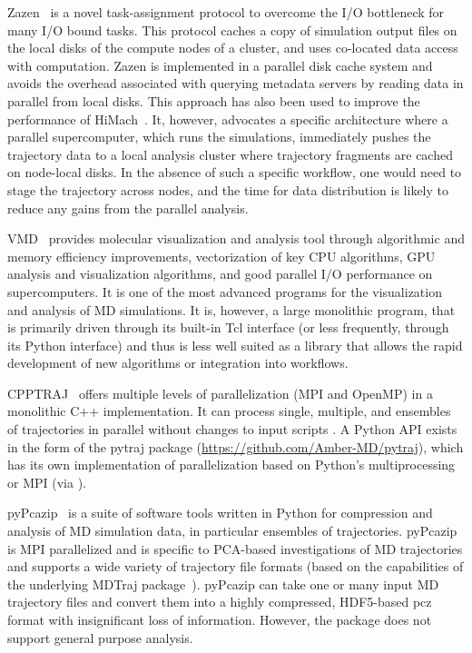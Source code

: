 Zazen~\cite{Zazen} is a novel task-assignment protocol to overcome the I/O bottleneck for many I/O bound tasks. This protocol caches a copy of simulation output files on the local disks of the compute nodes of a cluster, and uses co-located data access with computation. 
Zazen is implemented in a parallel disk cache system and avoids the overhead associated with querying metadata servers by reading data in parallel from local disks.
This approach has also been used to improve the performance of HiMach~\cite{himach-2008}.
It, however, advocates a specific architecture where a parallel supercomputer, which runs the simulations, immediately pushes the trajectory data to a local analysis cluster where trajectory fragments are cached on node-local disks.
In the absence of such a specific  workflow, one would need to stage the trajectory across nodes, and the time for data distribution is likely to reduce any gains from the parallel analysis.

VMD~\cite{Hum96, VMD2013} provides molecular visualization and analysis tool through algorithmic and memory efficiency improvements, vectorization of key CPU algorithms, GPU analysis and visualization algorithms, and good parallel I/O performance on supercomputers. It is one of the most advanced programs for the visualization and analysis of MD simulations. It is, however, a large monolithic program, that is primarily driven through its built-in Tcl interface (or less frequently, through its Python interface) and thus is less well suited as a library that allows the rapid development of new algorithms or integration into workflows.

CPPTRAJ~\cite{cpptraj-2013} offers multiple levels of parallelization (MPI and OpenMP) in a monolithic C++ implementation.
It can process single, multiple, and ensembles of trajectories in parallel without changes to input scripts \cite{Roe:2018aa}. 
A Python API exists in the form of the pytraj package (\url{https://github.com/Amber-MD/pytraj}), which has its own implementation of parallelization based on Python's multiprocessing or MPI (via  \cite{Dalcin:2011aa, Dalcin:2005aa}).

pyPcazip~\cite{pyPcazip} is a suite of software tools written in Python for compression and analysis of MD simulation data, in particular ensembles of trajectories. 
pyPcazip is MPI parallelized and is specific to PCA-based investigations of MD trajectories and supports a wide variety of trajectory file formats (based on the capabilities of the underlying MDTraj package~\cite{McGibbon:2015aa}).
pyPcazip can take one or many input MD trajectory files and convert them into a highly compressed, HDF5-based pcz format with insignificant loss of information.
However, the package does not support general purpose analysis.

